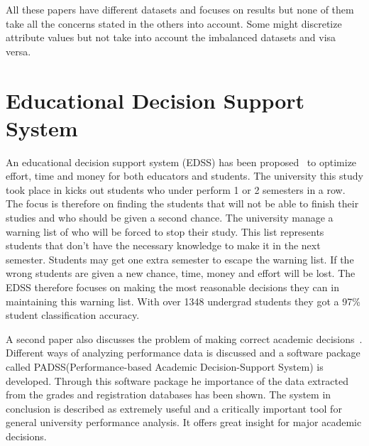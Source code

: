 \bigskip\noindent
All these papers have different datasets and focuses on results but none of them take all the concerns stated in the others into account. 
Some might discretize attribute values but not take into account the imbalanced datasets and visa versa.

\section{Educational Decision Support System}
An educational decision support system (EDSS) has been proposed~\cite{5} to optimize effort, time and money for both educators and students. 
The university this study took place in kicks out students who under perform 1 or 2 semesters in a row.
The focus is therefore on finding the students that will not be able to finish their studies and who should be given a second chance. 
The university manage a warning list of who will be forced to stop their study. 
This list represents students that don't have the necessary knowledge to make it in the next semester. 
Students may get one extra semester to escape the warning list. 
If the wrong students are given a new chance, time, money and effort will be lost. 
The EDSS therefore focuses on making the most reasonable decisions they can in maintaining this warning list. 
With over 1348 undergrad students they got a 97\% student classification accuracy.

\bigskip\noindent
A second paper also discusses the problem of making correct academic decisions~\cite{6}. 
Different ways of analyzing performance data is discussed and a software package called PADSS(Performance-based Academic Decision-Support System) is developed. 
Through this software package he importance of the data extracted from the grades and registration databases has been shown. 
The system in conclusion is described as extremely useful and a critically important tool for general university performance analysis.
It offers great insight for major academic decisions.
